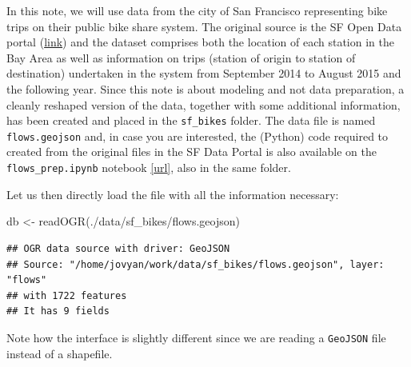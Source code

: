 \documentclass[
]{book}
\newenvironment{Shaded}{\begin{snugshade}}{\end{snugshade}}
\newcommand{\ConstantTok}[1]{\textcolor[rgb]{0.00,0.00,0.00}{#1}}
\newcommand{\FunctionTok}[1]{\textcolor[rgb]{0.00,0.00,0.00}{#1}}
\newcommand{\NormalTok}[1]{#1}
\newcommand{\OtherTok}[1]{\textcolor[rgb]{0.56,0.35,0.01}{#1}}
\newcommand{\SpecialCharTok}[1]{\textcolor[rgb]{0.00,0.00,0.00}{#1}}
\newcommand{\StringTok}[1]{\textcolor[rgb]{0.31,0.60,0.02}{#1}}
\begin{document}
In this note, we will use data from the city of San Francisco representing bike trips on their public bike share system. The original source is the SF Open Data portal (\href{http://www.bayareabikeshare.com/open-data}{link}) and the dataset comprises both the location of each station in the Bay Area as well as information on trips (station of origin to station of destination) undertaken in the system from September 2014 to August 2015 and the following year. Since this note is about modeling and not data preparation, a cleanly reshaped version of the data, together with some additional information, has been created and placed in the \texttt{sf\_bikes} folder. The data file is named \texttt{flows.geojson} and, in case you are interested, the (Python) code required to created from the original files in the SF Data Portal is also available on the \texttt{flows\_prep.ipynb} notebook \href{https://github.com/darribas/spa_notes/blob/master/sf_bikes/flows_prep.ipynb}{{[}url{]}}, also in the same folder.

Let us then directly load the file with all the information necessary:

\begin{Shaded}
\begin{Highlighting}[]
\NormalTok{db }\OtherTok{\textless{}{-}} \FunctionTok{readOGR}\NormalTok{(}\StringTok{\textquotesingle{}./data/sf\_bikes/flows.geojson\textquotesingle{}}\NormalTok{)}
\end{Highlighting}
\end{Shaded}

\begin{verbatim}
## OGR data source with driver: GeoJSON 
## Source: "/home/jovyan/work/data/sf_bikes/flows.geojson", layer: "flows"
## with 1722 features
## It has 9 fields
\end{verbatim}

\begin{Shaded}
\end{Shaded}

Note how the interface is slightly different since we are reading a \texttt{GeoJSON} file instead of a shapefile.
\end{document}
